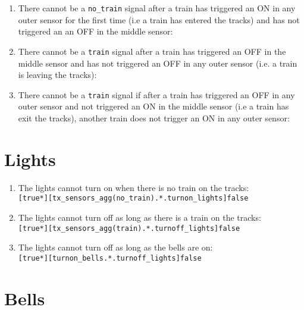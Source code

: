 \documentclass[final]{report}
\begin{document}
\begin{enumerate}
\item There cannot be a \texttt{no\_train} signal after a train has triggered an ON in any outer sensor for the first time (i.e a train has entered the tracks) and has not triggered an 
an OFF in the middle sensor:\\

\item There cannot be a \texttt{train} signal after a train has triggered an OFF in the middle sensor and has not triggered an OFF in any outer sensor (i.e. a train is leaving the
tracks):\\

\item There cannot be a \texttt{train} signal if after a train has triggered an OFF in any outer sensor and not triggered an ON in the middle sensor (i.e a train has exit
 the tracks), another train does not trigger an ON in any outer sensor:\\

\end{enumerate}


\section{Lights}

\begin{enumerate}
    \item The lights cannot turn on when there is no train on the tracks:\\
        \texttt{[true*][tx\_sensors\_agg(no\_train).*.turnon\_lights]false}

    \item The lights cannot turn off as long as there is a train on the tracks:\\
        \texttt{[true*][tx\_sensors\_agg(train).*.turnoff\_lights]false}

    \item The lights cannot turn off as long as the bells are on:\\
        \texttt{[true*][turnon\_bells.*.turnoff\_lights]false}
\end{enumerate}


\section{Bells}
\end{document}
